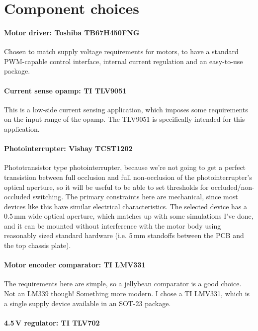 \documentclass[a4paper,11pt,article]{memoir}
\begin{document}
\section*{Component choices}

\paragraph{Motor driver: Toshiba TB67H450FNG}

Chosen to match supply voltage requirements for motors, to have a
standard PWM-capable control interface, internal current regulation
and an easy-to-use package.

\paragraph{Current sense opamp: TI TLV9051}

This is a low-side current sensing application, which imposes some
requirements on the input range of the opamp. The TLV9051 is
specifically intended for this application.

\paragraph{Photointerrupter: Vishay TCST1202}

Phototransistor type photointerrupter, because we're not going to get
a perfect transistion between full occlusion and full non-occlusion of
the photointerrupter's optical aperture, so it will be useful to be
able to set thresholds for occluded/non-occluded switching. The
primary constraints here are mechanical, since most devices like this
have similar electrical characteristics. The selected device has a
0.5\,mm wide optical aperture, which matches up with some simulations
I've done, and it can be mounted without interference with the motor
body using reasonably sized standard hardware (i.e. 5\,mm standoffs
between the PCB and the top chassis plate).

\paragraph{Motor encoder comparator: TI LMV331}

The requirements here are simple, so a jellybean comparator is a good
choice. Not an LM339 though! Something more modern. I chose a TI
LMV331, which is a single supply device available in an SOT-23 package.

\paragraph{4.5\,V regulator: TI TLV702}
\end{document}
